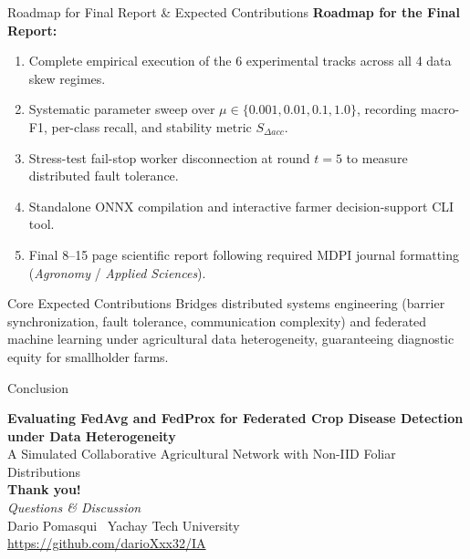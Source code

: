 \documentclass[aspectratio=169]{beamer}
\begin{document}
\begin{frame}{Roadmap for Final Report \& Expected Contributions}
    \textbf{Roadmap for the Final Report:}
    \begin{enumerate}
        \item Complete empirical execution of the 6 experimental tracks across all 4 data skew regimes.
        \item Systematic parameter sweep over $\mu \in \{0.001, 0.01, 0.1, 1.0\}$, recording macro-F1, per-class recall, and stability metric $S_{\Delta acc}$.
        \item Stress-test fail-stop worker disconnection at round $t=5$ to measure distributed fault tolerance.
        \item Standalone ONNX compilation and interactive farmer decision-support CLI tool.
        \item Final 8--15 page scientific report following required MDPI journal formatting (\textit{Agronomy} / \textit{Applied Sciences}).
    \end{enumerate}
    \vspace{0.3cm}
    \begin{block}{Core Expected Contributions}
        \footnotesize Bridges distributed systems engineering (barrier synchronization, fault tolerance, communication complexity) and federated machine learning under agricultural data heterogeneity, guaranteeing diagnostic equity for smallholder farms.
    \end{block}
\end{frame}

\begin{frame}{Conclusion}
    \begin{center}
        \Large \textbf{Evaluating FedAvg and FedProx for Federated Crop Disease Detection under Data Heterogeneity}\\[0.3cm]
        \normalsize A Simulated Collaborative Agricultural Network with Non-IID Foliar Distributions\\[0.6cm]
        \Large \textcolor{primary}{\textbf{Thank you!}}\\[0.25cm]
        \normalsize \textit{Questions \& Discussion}\\[0.4cm]
        \footnotesize Dario Pomasqui \textbar\ Yachay Tech University\\
        \url{https://github.com/darioXxx32/IA}
    \end{center}
\end{frame}
\end{document}

